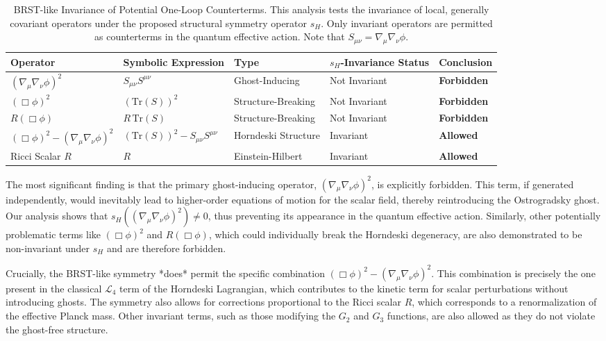 \documentclass[twocolumn]{aastex631}
\begin{document}
\begin{table}[t]
\centering
\caption{BRST-like Invariance of Potential One-Loop Counterterms. This analysis tests the invariance of local, generally covariant operators under the proposed structural symmetry operator $s_H$. Only invariant operators are permitted as counterterms in the quantum effective action. Note that $S_{\mu\nu} = \nabla_\mu\nabla_\nu\phi$.}
\begin{tabular}{l l l l l}
\hline
\textbf{Operator} & \textbf{Symbolic Expression} & \textbf{Type} & \textbf{$s_H$-Invariance Status} & \textbf{Conclusion} \\
\hline
$(\nabla_\mu\nabla_\nu\phi)^2$ & $S_{\mu\nu} S^{\mu\nu}$ & Ghost-Inducing & Not Invariant & \textbf{Forbidden} \\
$(\Box\phi)^2$ & $(\text{Tr}(S))^2$ & Structure-Breaking & Not Invariant & \textbf{Forbidden} \\
$R (\Box\phi)$ & $R \, \text{Tr}(S)$ & Structure-Breaking & Not Invariant & \textbf{Forbidden} \\
$(\Box\phi)^2 - (\nabla_\mu\nabla_\nu\phi)^2$ & $(\text{Tr}(S))^2 - S_{\mu\nu} S^{\mu\nu}$ & Horndeski Structure & Invariant & \textbf{Allowed} \\
Ricci Scalar $R$ & $R$ & Einstein-Hilbert & Invariant & \textbf{Allowed} \\
\hline
\end{tabular}
\label{tab:brst_invariance}
\end{table}

The most significant finding is that the primary ghost-inducing operator, $(\nabla_\mu\nabla_\nu\phi)^2$, is explicitly forbidden. This term, if generated independently, would inevitably lead to higher-order equations of motion for the scalar field, thereby reintroducing the Ostrogradsky ghost. Our analysis shows that $s_H((\nabla_\mu\nabla_\nu\phi)^2) \neq 0$, thus preventing its appearance in the quantum effective action. Similarly, other potentially problematic terms like $(\Box\phi)^2$ and $R(\Box\phi)$, which could individually break the Horndeski degeneracy, are also demonstrated to be non-invariant under $s_H$ and are therefore forbidden.

Crucially, the BRST-like symmetry *does* permit the specific combination $(\Box\phi)^2 - (\nabla_\mu\nabla_\nu\phi)^2$. This combination is precisely the one present in the classical $\mathcal{L}_4$ term of the Horndeski Lagrangian, which contributes to the kinetic term for scalar perturbations without introducing ghosts. The symmetry also allows for corrections proportional to the Ricci scalar $R$, which corresponds to a renormalization of the effective Planck mass. Other invariant terms, such as those modifying the $G_2$ and $G_3$ functions, are also allowed as they do not violate the ghost-free structure.
\end{document}
